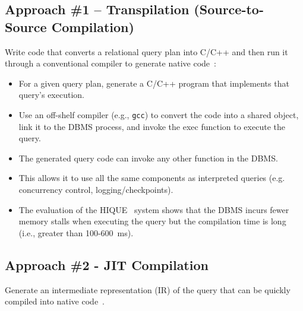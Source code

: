 \documentclass[11pt]{article}
\begin{document}
\subsection*{Approach \#1 -- Transpilation (Source-to-Source Compilation)}
Write code that converts a relational query plan into 
C/C++ and then run it through a conventional compiler to generate native 
code~\cite{krikellas10}:
\begin{itemize}
    \item
    For a given query plan, generate a C/C++ program that implements that query's execution.
    
    \item
    Use an off-shelf compiler (e.g., \texttt{gcc}) to convert the code into a shared object, 
    link it to the DBMS process, and invoke the exec function to execute the query.
    
    \item
    The generated query code can invoke any other function in the DBMS.
    
    \item
    This allows it to use all the same components as interpreted queries (e.g. 
    concurrency control, logging/checkpoints).
    
    \item
    The evaluation of the HIQUE~\cite{krikellas10} system shows that the DBMS incurs fewer 
    memory stalls when executing the query but the compilation time is long (i.e., 
    greater than 100-600~ms).
\end{itemize}
    
\subsection*{Approach \#2 - JIT Compilation}
Generate an intermediate representation (IR) of the query that can be quickly compiled into 
native code~\cite{neumann11}.
\end{document}
